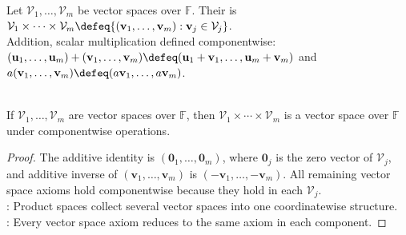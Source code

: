 \begin{definition} \\
Let $\mathcal{V}_1,\ldots,\mathcal{V}_m$ be vector spaces over $\mathbb{F}$. Their  is $\mathcal{V}_1\times\cdots\times\mathcal{V}_m \defeq \{(\mathbf{v}_1,\ldots,\mathbf{v}_m):\mathbf{v}_j\in\mathcal{V}_j\}$.\\
Addition, scalar multiplication defined componentwise: $(\mathbf{u}_1,\ldots,\mathbf{u}_m)+(\mathbf{v}_1,\ldots,\mathbf{v}_m) \defeq (\mathbf{u}_1+\mathbf{v}_1,\ldots,\mathbf{u}_m+\mathbf{v}_m)$ and $a(\mathbf{v}_1,\ldots,\mathbf{v}_m) \defeq (a\mathbf{v}_1,\ldots,a\mathbf{v}_m)$.
\end{definition}

\begin{proposition} \label{prop:product-vector-space} \\
If $\mathcal{V}_1,\ldots,\mathcal{V}_m$ are vector spaces over $\mathbb{F}$, then $\mathcal{V}_1\times\cdots\times\mathcal{V}_m$ is a vector space over $\mathbb{F}$ under componentwise operations.
\begin{proof}
The additive identity is $(\mathbf{0}_1,\ldots,\mathbf{0}_m)$, where $\mathbf{0}_j$ is the zero vector of $\mathcal{V}_j$, and additive inverse of $(\mathbf{v}_1,\ldots,\mathbf{v}_m)$ is $(-\mathbf{v}_1,\ldots,-\mathbf{v}_m)$. All remaining vector space axioms hold componentwise because they hold in each $\mathcal{V}_j$.\\
: Product spaces collect several vector spaces into one coordinatewise structure.\\
: Every vector space axiom reduces to the same axiom in each component.
\end{proof}
\end{proposition}

